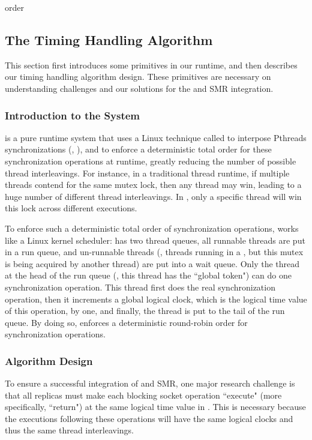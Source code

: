 order %
\crane %


\subsection{The Timing Handling Algorithm} \label{sec:rep-time-algo}
This section first introduces some primitives in our \parrot \smt runtime, and
then describes our timing handling algorithm design. These \parrot primitives
are necessary on understanding challenges and our solutions for the \smt and SMR
integration.

\subsubsection{Introduction to the \parrot \smt System} \label{sec:rep-parrot}
\parrot is a pure runtime system that uses a Linux technique called \ldpreload
to interpose Pthreads synchronizations (\eg, \mutexlock), and to enforce a
deterministic total order for these synchronization operations at runtime,
greatly reducing the number of possible thread interleavings. For instance, in a
traditional thread runtime, if multiple threads contend for the same mutex lock,
then any thread may win, leading to a huge number of different thread
interleavings. In \parrot, only a specific thread will win this lock across
different executions.

To enforce such a deterministic total order of synchronization operations,
\parrot works like a Linux kernel scheduler: \parrot has two thread queues, all
runnable threads are put in a run queue, and un-runnable threads (\eg, threads
running in a \mutexlock, but this mutex is being acquired by another thread) are
put into a wait queue. Only the thread at the head of the run queue (\ie, this
thread has the ``global token") can do one synchronization operation. This
thread first does the real synchronization operation, then it increments a
global logical clock, which is the logical time value of this operation, by one,
and finally, the thread is put to the tail of the run queue. By doing so,
\parrot enforces a deterministic round-robin order for synchronization
operations.


\subsubsection{Algorithm Design} \label{sec:rep-algo-rules}
To ensure a successful integration of \smt and SMR, one major research challenge
is that all replicas must make each blocking socket operation ``execute" (more
specifically, ``return") at the same logical time value in \smt. This is
necessary because the executions following these operations will have the same
logical clocks and thus the same thread interleavings.

